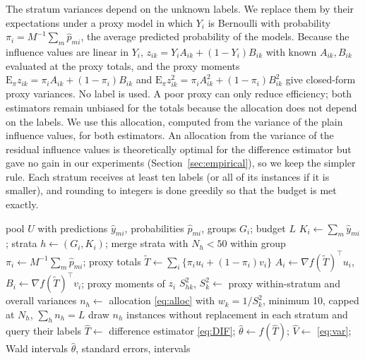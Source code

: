 \documentclass[pdflatex,sn-mathphys-num,iicol]{sn-jnl}
\theoremstyle{thmstyleone}
\theoremstyle{thmstyletwo}
\theoremstyle{thmstylethree}
\begin{document}
The stratum variances depend on the unknown labels. We replace them by their expectations under a proxy model in which $Y_i$ is Bernoulli with probability $\pi_i=M^{-1}\sum_m\hat p_{mi}$, the average predicted probability of the models. Because the influence values are linear in $Y_i$, $z_{ik}=Y_iA_{ik}+(1-Y_i)B_{ik}$ with known $A_{ik},B_{ik}$ evaluated at the proxy totals, and the proxy moments $\mathrm E_\pi z_{ik}=\pi_iA_{ik}+(1-\pi_i)B_{ik}$ and $\mathrm E_\pi z^2_{ik}=\pi_iA^2_{ik}+(1-\pi_i)B^2_{ik}$ give closed-form proxy variances. No label is used. A poor proxy can only reduce efficiency; both estimators remain unbiased for the totals because the allocation does not depend on the labels. We use this allocation, computed from the variance of the plain influence values, for both estimators. An allocation from the variance of the residual influence values is theoretically optimal for the difference estimator but gave no gain in our experiments (Section~\ref{sec:empirical}), so we keep the simpler rule. Each stratum receives at least ten labels (or all of its instances if it is smaller), and rounding to integers is done greedily so that the budget is met exactly.

\begin{algorithm}[t]
\caption{PATTERN-DIF for comparing $M$ classifiers on group-fairness contrasts}\label{alg:pattern}
\begin{algorithmic}[1]
\Require pool $U$ with predictions $\hat y_{mi}$, probabilities $\hat p_{mi}$, groups $G_i$; budget $L$
\State $K_i\gets\sum_m\hat y_{mi}$; strata $h\gets(G_i,K_i)$; merge strata with $N_h<50$ within group
\State $\pi_i\gets M^{-1}\sum_m\hat p_{mi}$; proxy totals $\tilde T\gets\sum_i\{\pi_iu_i+(1-\pi_i)v_i\}$
\State $A_i\gets\nabla f(\tilde T)^\top u_i$, $B_i\gets\nabla f(\tilde T)^\top v_i$; proxy moments of $z_i$
\State $S^2_{hk}$, $S^2_k\gets$ proxy within-stratum and overall variances
\State $n_h\gets$ allocation \eqref{eq:alloc} with $w_k=1/S^2_k$, minimum 10, capped at $N_h$, $\sum_h n_h=L$
\State draw $n_h$ instances without replacement in each stratum and query their labels
\State $\hat T\gets$ difference estimator \eqref{eq:DIF}; $\hat\theta\gets f(\hat T)$; $\hat V\gets$ \eqref{eq:var}; Wald intervals
\State \Return $\hat\theta$, standard errors, intervals
\end{algorithmic}
\end{algorithm}
\end{document}
